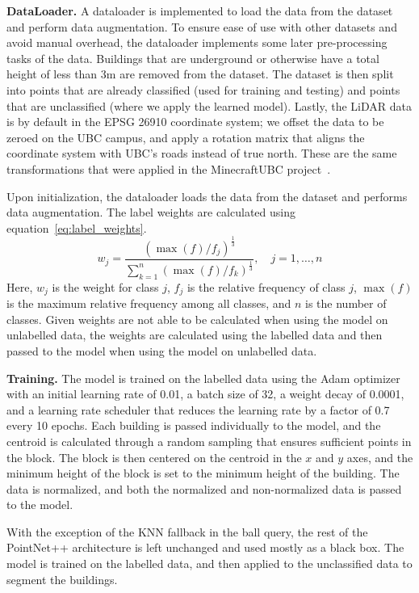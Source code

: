 \documentclass[10pt,twocolumn,letterpaper]{article}
\begin{document}
    \textbf{DataLoader.} A dataloader is implemented to load the data from the dataset and perform data augmentation.
    To ensure ease of use with other datasets and avoid manual overhead, the dataloader implements some later pre-processing tasks of the data. 
    Buildings that are underground or otherwise have a total height of less than 3m are removed from the dataset.
    The dataset is then split into points that are already classified (used for training and testing) and points that are unclassified (where we apply the learned model).
    Lastly, the LiDAR data is by default in the EPSG 26910 coordinate system; we offset the data to be zeroed on the UBC campus, and apply a rotation matrix that aligns the coordinate system with UBC's roads instead of true north.
    These are the same transformations that were applied in the MinecraftUBC project~\cite{MinecraftUBC}.

    Upon initialization, the dataloader loads the data from the dataset and performs data augmentation.
    The label weights are calculated using equation~\ref{eq:label_weights}.
\begin{equation}
    \label{eq:label_weights}
    w_j = \frac{(\max(f) / f_j)^{\frac{1}{3}}}{\sum_{k=1}^{n} (\max(f) / f_k)^{\frac{1}{3}}}, \quad j = 1, \dots, n
\end{equation}
Here, \( w_j \) is the weight for class \( j \), \( f_j \) is the relative frequency of class \( j \), \( \max(f) \) is the maximum relative frequency among all classes, and \( n \) is the number of classes.
Given weights are not able to be calculated when using the model on unlabelled data, the weights are calculated using the labelled data and then passed to the model when using the model on unlabelled data.


    \textbf{Training.} The model is trained on the labelled data using the Adam optimizer with an initial learning rate of 0.01, a batch size of 32, a weight decay of 0.0001, and a learning rate scheduler that reduces the learning rate by a factor of 0.7 every 10 epochs.
    Each building is passed individually to the model, and the centroid is calculated through a random sampling that ensures sufficient points in the block.
    The block is then centered on the centroid in the $x$ and $y$ axes, and the minimum height of the block is set to the minimum height of the building.
    The data is normalized, and both the normalized and non-normalized data is passed to the model.

    With the exception of the KNN fallback in the ball query, the rest of the PointNet++ architecture is left unchanged and used mostly as a black box.
    The model is trained on the labelled data, and then applied to the unclassified data to segment the buildings.
\end{document}
